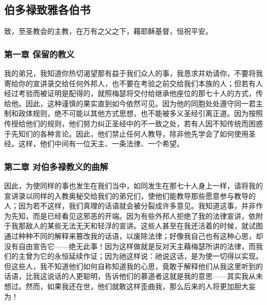 \subsection{伯多禄致雅各伯书}

致，至圣教会的主教，在万有之父之下，藉耶稣基督，恒祝平安。\par


\subsubsection{第一章 保留的教义}

我的弟兄，我知道你热切渴望那有益于我们众人的事，我恳求并劝请你，不要将我寄给你的宣讲录交给任何外邦人，也不要在考验之前交给我们本族的人；但若有人经过考验而被证明是配得的，就照梅瑟将交付给继承他座位的那七十人的方式，传给他。因此，这种谨慎的果实直到如今依然可见。因为他的同胞处处遵守同一君主制和政体规则，绝不可能以其他方式思想，也不能被多义圣经引离正道。因为按照传授给他们的规则，他们努力纠正圣经中的不一致之处，若有人因不知传统而困惑于先知们的各种言论。因此，他们禁止任何人教导，除非他先学会了如何使用圣经。这样，他们中间有一位天主、一条法律、一个希望。\par


\subsubsection{第二章 对伯多禄教义的曲解}

因此，为使同样的事也发生在我们当中，如同发生在那七十人身上一样，请将我的宣讲录以同样的入教奥秘交给我们的弟兄们，使他们能教导那些愿意参与教导的人；因为若不这样，我们真理的话语就会被分裂成许多意见。我知道这事，并非作为先知，而是已经看见这邪恶的开端。因为有些外邦人拒绝了我的法律宣讲，依附于我那敌人的某些无法无天和轻浮的宣讲。这些人甚至在我还活着的时候，就试图通过种种不同的解释来篡改我的话语，以废除法律；好像我自己也有这种心思，却没有自由宣告它——绝无此事！因为这样做就是反对天主藉梅瑟所讲的法律，而我们的主曾为它的永恒延续作证；因为祂这样说：祂说这话，是为使一切得以实现。但这些人，我不知道他们如何自称知道我的心思，竟敢于解释他们从我这里听到的话语，比我这说话的人更聪明，告诉他们的慕道者这就是我的意思——其实我从未想过。然而，如果我还在世，他们就敢这样歪曲我，那么后来的人将更加胆大妄为！\par

